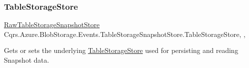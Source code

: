 \subsubsection{\texorpdfstring{Table\+Storage\+Store}{TableStorageStore}}
{\footnotesize\ttfamily \hyperlink{classCqrs_1_1Azure_1_1BlobStorage_1_1Events_1_1TableStorageSnapshotStore_1_1RawTableStorageSnapshotStore}{Raw\+Table\+Storage\+Snapshot\+Store} Cqrs.\+Azure.\+Blob\+Storage.\+Events.\+Table\+Storage\+Snapshot\+Store.\+Table\+Storage\+Store\hspace{0.3cm}{\ttfamily [get]}, {\ttfamily [set]}, {\ttfamily [protected]}}



Gets or sets the underlying \hyperlink{classCqrs_1_1Azure_1_1BlobStorage_1_1TableStorageStore}{Table\+Storage\+Store} used for persisting and reading Snapshot data. 

